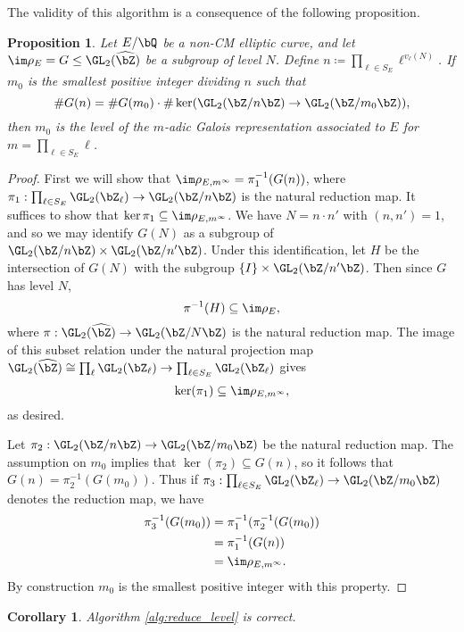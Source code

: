 \documentclass[11pt,reqno]{amsart}
\theoremstyle{plain}
\newtheorem{proposition}[theorem]{Proposition}
\newtheorem{corollary}[theorem]{Corollary}
\theoremstyle{definition}
\newcommand{\Q}{\bQ}
\newcommand{\Z}{\bZ}
\newcommand{\abedit}[1]{{\color{blue} #1}}
\begin{document}
\abedit{The validity of this algorithm is a consequence of the following proposition.}
  \begin{proposition}
  Let $E/\Q$ be a non-CM elliptic curve, and let $\im \rho_E=G \leq \GL_2(\widehat{\Z})$ be a subgroup of level $N$. Define $n \coloneqq \prod_{\ell \in S_E} \ell^{v_{\ell}(N)}$. If $m_0$ is the smallest positive integer dividing $n$ such that \[\#G(n)=\#G(m_0) \cdot \#\ker(\GL_2(\Z/n\Z) \rightarrow \GL_2(\Z/m_0\Z)),\] then $m_0$ is the level of the $m$-adic Galois representation associated to $E$ for $m= \prod_{\ell \in S_E} \ell$.
  \end{proposition}
  \begin{proof}
  First we will show that $\im \rho_{E,m^{\infty}}=\pi_1^{-1}(G(n))$, where $\pi_1:\prod_{\ell \in S_E} \GL_2(\Z_{\ell}) \rightarrow \GL_2(\Z/n\Z)$ is the natural reduction map. It suffices to show that $\ker \pi_1 \subseteq \im \rho_{E,m^{\infty}}$. We have $N=n\cdot n'$ with $(n,n')=1$, and so we may identify $G(N)$ as a subgroup of $\GL_2(\Z/n\Z) \times \GL_2(\Z/n'\Z)$. Under this identification, let $H$  be the intersection of $G(N)$ with the subgroup $\{I\} \times \GL_2(\Z/n'\Z)$. Then since $G$ has level $N$,
  \[
  \pi^{-1}(H) \subseteq \im \rho_E,
  \]
  where $\pi: \GL_2(\widehat{\Z}) \rightarrow \GL_2(\Z/N\Z)$ is the natural reduction map. The image of this subset relation under the natural projection map  $\GL_2(\widehat{\Z}) \cong \prod_{\ell} \GL_2(\Z_{\ell}) \rightarrow  \prod_{\ell \in S_E} \GL_2(\Z_{\ell}) $ gives
  \[
  \ker(\pi_1) \subseteq \im \rho_{E,m^{\infty}},
  \]
  as desired.

Let $\pi_2: \GL_2(\Z/n\Z) \rightarrow \GL_2(\Z/m_0\Z)$ be the natural reduction map. The assumption on $m_0$ implies that $\ker(\pi_2) \subseteq G(n)$, so it follows that $G(n) = \pi_2^{-1}(G(m_0))$. Thus if $\pi_3: \prod_{\ell \in S_E} \GL_2(\Z_{\ell}) \rightarrow \GL_2(\Z/m_0\Z)$ denotes the reduction map, we have
  \begin{align*}
  \pi_3^{-1}(G(m_0))&=\pi_1^{-1}(\pi_2^{-1}(G(m_0))\\
  &=\pi_1^{-1}(G(n))\\
  &=\im \rho_{E,m^{\infty}}.
  \end{align*}
By construction $m_0$ is the smallest positive integer with this property.
  \end{proof}

  \begin{corollary}
  Algorithm \ref{alg:reduce_level} is correct.
  \end{corollary}
\end{document}
